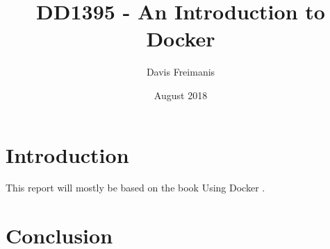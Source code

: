 \documentclass{article}
\title{DD1395 - An Introduction to Docker}
\author{Davis Freimanis}
\date{August 2018}
\begin{document}
\maketitle

\section{Introduction}
This report will mostly be based on the book Using Docker \cite{mouat2015using}.

\section{Conclusion}



\end{document}
